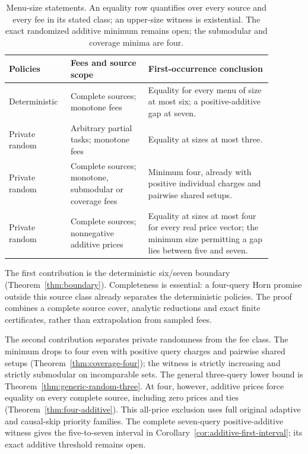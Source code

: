 \documentclass[pdflatex,sn-mathphys-num]{sn-jnl}
\theoremstyle{thmstyleone}
\theoremstyle{thmstylethree}
\theoremstyle{thmstyletwo}
\begin{document}
\begin{table}[ht]
\centering\small
\begin{tabular}{@{}p{0.18\linewidth}p{0.27\linewidth}p{0.43\linewidth}@{}}
\toprule
Policies & Fees and source scope & First-occurrence conclusion\\
\midrule
Deterministic & Complete sources; monotone fees
& Equality for every menu of size at most six; a positive-additive gap at seven.\\[3pt]
Private random & Arbitrary partial tasks; monotone fees
& Equality at sizes at most three.\\[3pt]
Private random & Complete sources; monotone, submodular or coverage fees
& Minimum four, already with positive individual charges and pairwise shared setups.\\[3pt]
Private random & Complete sources; nonnegative additive prices
& Equality at sizes at most four for every real price vector; the minimum size permitting a gap lies between five and seven.\\
\bottomrule
\end{tabular}
\caption{Menu-size statements. An equality row quantifies over every source
and every fee in its stated class; an upper-size witness is existential.
The exact randomized additive minimum remains open; the submodular and coverage minima are four.}
\label{tab:core-boundaries}
\end{table}

The first contribution is the deterministic six/seven boundary
(Theorem~\ref{thm:boundary}). Completeness is essential: a four-query Horn
promise outside this source class already separates the deterministic
policies. The proof combines a complete source cover, analytic reductions
and exact finite certificates, rather than extrapolation from sampled fees.

The second contribution separates private randomness from the fee class.
The minimum drops to four even with positive query charges and pairwise
shared setups (Theorem~\ref{thm:coverage-four}); the witness is strictly
increasing and strictly submodular on incomparable sets. The general
three-query lower bound is Theorem~\ref{thm:generic-random-three}.
At four, however, additive prices force equality on every complete source,
including zero prices and ties (Theorem~\ref{thm:four-additive}). This
all-price exclusion uses full original adaptive and causal-skip priority
families. The complete seven-query positive-additive witness gives the
five-to-seven interval in Corollary~\ref{cor:additive-first-interval};
its exact additive threshold remains open.
\end{document}
